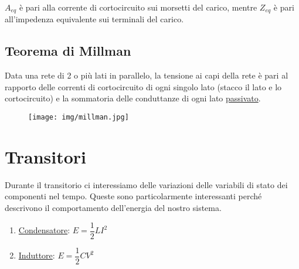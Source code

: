 \documentclass{article}
\begin{document}
\noindent $A_{eq}$ è pari alla corrente di cortocircuito sui morsetti del carico, mentre $Z_{eq}$ è pari all'impedenza equivalente sui
terminali del carico.

\subsection{Teorema di Millman}
Data una rete di 2 o più lati in parallelo, la tensione ai capi della rete è pari al rapporto delle correnti di cortocircuito di ogni singolo lato
(stacco il lato e lo cortocircuito) e la sommatoria delle conduttanze di ogni lato \underline{passivato}.


\medskip
\noindent{}

\begin{figure}[h!]
    \begin{center}
        \texttt{[image: img/millman.jpg]}
    \end{center}
\end{figure}
\pagebreak

\section{Transitori}
\noindent Durante il transitorio ci interessiamo delle variazioni delle variabili di stato dei componenti nel tempo. 
Queste sono particolarmente interessanti perché descrivono il comportamento dell'energia del nostro sistema.

\begin{enumerate}
    \item \underline{Condensatore}: $E=\dfrac{1}{2}LI^2$
    \item \underline{Induttore}: $E=\dfrac{1}{2}CV^2$
\end{enumerate}

\medskip
\noindent{}
\medskip
\end{document}
